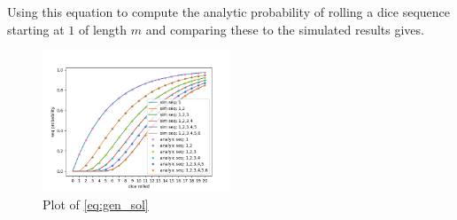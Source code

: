 \documentclass[12pt,a4paper]{article}
\begin{document}
Using this equation to compute the analytic probability of rolling a dice sequence starting at $1$ of length $m$ and comparing these to the simulated results gives.

\begin{figure}[H]
    \centering
    \includegraphics[width=0.5\textwidth]{figs/full_compare_analytic_sim.png}
    \caption{Plot of \cref{eq:gen_sol}}
    \label{fig:gen_sol}
\end{figure}
\end{document}
